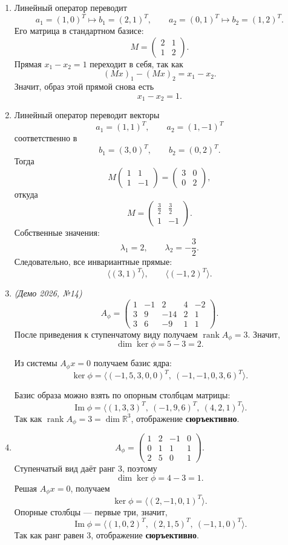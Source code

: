 \begin{enumerate}
\item
Линейный оператор переводит
\[
a_1=(1,0)^T\mapsto b_1=(2,1)^T,\qquad
a_2=(0,1)^T\mapsto b_2=(1,2)^T.
\]
Его матрица в стандартном базисе:
\[
M=\begin{pmatrix}2&1\\1&2\end{pmatrix}.
\]
Прямая \(x_1-x_2=1\) переходит в себя, так как
\[
(Mx)_1-(Mx)_2=x_1-x_2.
\]
Значит, образ этой прямой снова есть
\[
x_1-x_2=1.
\]

\item
Линейный оператор переводит векторы
\[
a_1=(1,1)^T,\qquad a_2=(1,-1)^T
\]
соответственно в
\[
b_1=(3,0)^T,\qquad b_2=(0,2)^T.
\]
Тогда
\[
M\begin{pmatrix}1&1\\1&-1\end{pmatrix}
=\begin{pmatrix}3&0\\0&2\end{pmatrix},
\]
откуда
\[
M=\begin{pmatrix}
\frac32&\frac32\\[2mm]
1&-1
\end{pmatrix}.
\]
Собственные значения:
\[
\lambda_1=2,\qquad \lambda_2=-\frac32.
\]
Следовательно, все инвариантные прямые:
\[
\langle (3,1)^T\rangle,\qquad \langle (-1,2)^T\rangle.
\]

\item \textit{(Демо 2026, №14)}
\[
A_\phi=\begin{pmatrix}
1&-1&2&4&-2\\
3&9&-14&2&1\\
3&6&-9&1&1
\end{pmatrix}.
\]
После приведения к ступенчатому виду получаем \(\operatorname{rank}A_\phi=3\).
Значит,
\[
\dim\ker\phi=5-3=2.
\]

Из системы \(A_\phi x=0\) получаем базис ядра:
\[
\ker\phi=\langle (-1,5,3,0,0)^T,\ (-1,-1,0,3,6)^T\rangle.
\]

Базис образа можно взять по опорным столбцам матрицы:
\[
\operatorname{Im}\phi=\langle (1,3,3)^T,\ (-1,9,6)^T,\ (4,2,1)^T\rangle.
\]
Так как \(\operatorname{rank}A_\phi=3=\dim\mathbb R^3\), отображение \textbf{сюръективно}.

\item
\[
A_\phi=\begin{pmatrix}
1&2&-1&0\\
0&1&1&1\\
2&5&0&1
\end{pmatrix}.
\]
Ступенчатый вид даёт ранг \(3\), поэтому
\[
\dim\ker\phi=4-3=1.
\]
Решая \(A_\phi x=0\), получаем
\[
\ker\phi=\langle (2,-1,0,1)^T\rangle.
\]
Опорные столбцы --- первые три, значит,
\[
\operatorname{Im}\phi=\langle (1,0,2)^T,\ (2,1,5)^T,\ (-1,1,0)^T\rangle.
\]
Так как ранг равен \(3\), отображение \textbf{сюръективно}.


\end{enumerate}
